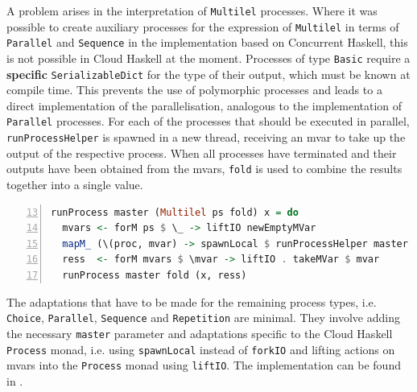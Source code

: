 A problem arises in the interpretation of \texttt{Multilel} processes. Where it was possible to create auxiliary processes for the expression of \texttt{Multilel} in terms of \texttt{Parallel} and \texttt{Sequence} in the implementation based on \textsf{Concurrent Haskell}, this is not possible in \textsf{Cloud Haskell} at the moment. Processes of type \texttt{Basic} require a \textbf{specific} \texttt{SerializableDict} for the type of their output, which must be known at compile time. This prevents the use of polymorphic processes and leads to a direct implementation of the parallelisation, analogous to the implementation of \texttt{Parallel} processes. For each of the processes that should be executed in parallel, \texttt{runProcessHelper} is spawned in a new thread, receiving an mvar to take up the output of the respective process. When all processes have terminated and their outputs have been obtained from the mvars, \texttt{fold} is used to combine the results together into a single value.
\begin{lstlisting}[language=Haskell,caption=Implementation of the interpreter for \texttt{Multilel} processes.,label=lst:runprocess_multilel,numbers=left,frame=bt,firstnumber=13]
runProcess master (Multilel ps fold) x = do
  mvars <- forM ps $ \_ -> liftIO newEmptyMVar
  mapM_ (\(proc, mvar) -> spawnLocal $ runProcessHelper master proc x mvar) (ps `zip` mvars)
  ress  <- forM mvars $ \mvar -> liftIO . takeMVar $ mvar
  runProcess master fold (x, ress)
\end{lstlisting}

The adaptations that have to be made for the remaining process types, i.e. \texttt{Choice}, \texttt{Parallel}, \texttt{Sequence} and \texttt{Repetition} are minimal. They involve adding the necessary \texttt{master} parameter and adaptations specific to the \textsf{Cloud Haskell} \texttt{Process} monad, i.e. using \texttt{spawnLocal} instead of \texttt{forkIO} and lifting actions on mvars into the \texttt{Process} monad using \texttt{liftIO}. The implementation can be found in .




